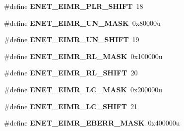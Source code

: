 \begin{DoxyCompactItemize}
\item 
\#define {\bfseries E\+N\+E\+T\+\_\+\+E\+I\+M\+R\+\_\+\+P\+L\+R\+\_\+\+S\+H\+I\+FT}~18\hypertarget{group__ENET__Register__Masks_ga33f60d12aece934e2487e49ce770df3c}{}\label{group__ENET__Register__Masks_ga33f60d12aece934e2487e49ce770df3c}

\item 
\#define {\bfseries E\+N\+E\+T\+\_\+\+E\+I\+M\+R\+\_\+\+U\+N\+\_\+\+M\+A\+SK}~0x80000u\hypertarget{group__ENET__Register__Masks_gaed618c09cc7404a695cd7b2b9d488c4d}{}\label{group__ENET__Register__Masks_gaed618c09cc7404a695cd7b2b9d488c4d}

\item 
\#define {\bfseries E\+N\+E\+T\+\_\+\+E\+I\+M\+R\+\_\+\+U\+N\+\_\+\+S\+H\+I\+FT}~19\hypertarget{group__ENET__Register__Masks_ga3ca7ee192fb843e401b068f700a46880}{}\label{group__ENET__Register__Masks_ga3ca7ee192fb843e401b068f700a46880}

\item 
\#define {\bfseries E\+N\+E\+T\+\_\+\+E\+I\+M\+R\+\_\+\+R\+L\+\_\+\+M\+A\+SK}~0x100000u\hypertarget{group__ENET__Register__Masks_gad54230a57ae1121bab21b886686e7e10}{}\label{group__ENET__Register__Masks_gad54230a57ae1121bab21b886686e7e10}

\item 
\#define {\bfseries E\+N\+E\+T\+\_\+\+E\+I\+M\+R\+\_\+\+R\+L\+\_\+\+S\+H\+I\+FT}~20\hypertarget{group__ENET__Register__Masks_gadc63c149d082277bddef529b116ba5a7}{}\label{group__ENET__Register__Masks_gadc63c149d082277bddef529b116ba5a7}

\item 
\#define {\bfseries E\+N\+E\+T\+\_\+\+E\+I\+M\+R\+\_\+\+L\+C\+\_\+\+M\+A\+SK}~0x200000u\hypertarget{group__ENET__Register__Masks_ga0bf96f263256f08db96c8f360fae4f14}{}\label{group__ENET__Register__Masks_ga0bf96f263256f08db96c8f360fae4f14}

\item 
\#define {\bfseries E\+N\+E\+T\+\_\+\+E\+I\+M\+R\+\_\+\+L\+C\+\_\+\+S\+H\+I\+FT}~21\hypertarget{group__ENET__Register__Masks_gac03f587cafc7bd0f14a6fefd20652d22}{}\label{group__ENET__Register__Masks_gac03f587cafc7bd0f14a6fefd20652d22}

\item 
\#define {\bfseries E\+N\+E\+T\+\_\+\+E\+I\+M\+R\+\_\+\+E\+B\+E\+R\+R\+\_\+\+M\+A\+SK}~0x400000u\hypertarget{group__ENET__Register__Masks_ga3934d5654ba643ea4b989b299418dc22}{}\label{group__ENET__Register__Masks_ga3934d5654ba643ea4b989b299418dc22}


\end{DoxyCompactItemize}
